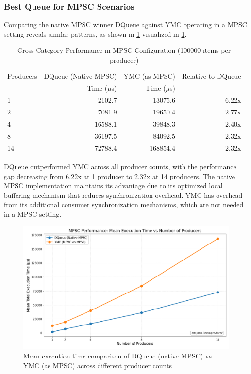 \subsubsection{Best Queue for \ac{MPSC} Scenarios}
Comparing the native \ac{MPSC} winner DQueue against \ac{YMC} operating in a \ac{MPSC} setting reveals similar patterns, as shown in \cref{tab:best-mpsc} visualized in \cref{fig:cross-mpsc-mean}.

\begin{table}[htb]
\centering
\caption{Cross-Category Performance in \ac{MPSC} Configuration (100000 items per producer)}
\label{tab:best-mpsc}
\begin{tabular}{@{}lrrr@{}}
\toprule
Producers & DQueue (Native \ac{MPSC}) & \ac{YMC} (as \ac{MPSC}) & Relative to DQueue \\
& Time ($\mu$s) & Time ($\mu$s) & \\
\midrule
1 & 2102.7 & 13075.6 & 6.22x \\
2 & 7081.9 & 19650.4 & 2.77x \\
4 & 16588.1 & 39848.3 & 2.40x \\
8 & 36197.5 & 84092.5 & 2.32x \\
14 & 72788.4 & 168854.4 & 2.32x \\
\bottomrule
\end{tabular}
\end{table}

DQueue outperformed \ac{YMC} across all producer counts, with the performance gap decreasing from 6.22x at 1 producer to 2.32x at 14 producers. The native \ac{MPSC} implementation maintains its advantage due to its optimized local buffering mechanism that reduces synchronization overhead. \ac{YMC} has overhead from its additional consumer synchronization mechanisms, which are not needed in a \ac{MPSC} setting.

\begin{figure}[htb]
\centering
\caption{Mean execution time comparison of DQueue (native MPSC) vs YMC (as MPSC) across different producer counts}
\label{fig:cross-mpsc-mean}
\includegraphics[width=\textwidth]{images/results/best_in_mpsc_mean_performance_vs_producers.png}
\end{figure}

